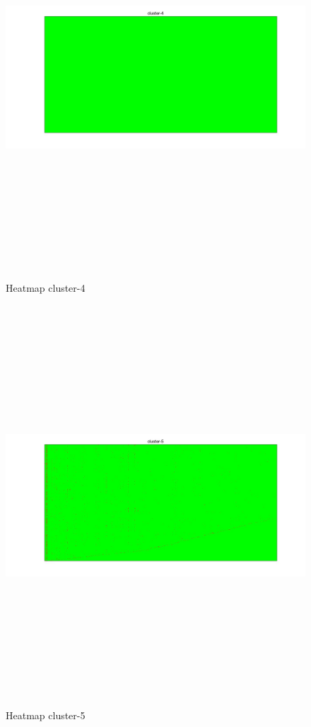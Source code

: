 \begin{figure}[htbp]
	\centering
	\includegraphics[width=\linewidth,height=15cm,keepaspectratio]{analisis/cluster-4.jpg}
	\caption{Heatmap cluster-4}
	\label{pic:cluster-4}
\end{figure}


\begin{figure}[htbp]
	\centering
	\includegraphics[width=\linewidth,height=15cm,keepaspectratio]{analisis/cluster-5.jpg}
	\caption{Heatmap cluster-5}
	\label{pic:cluster-5}
\end{figure}